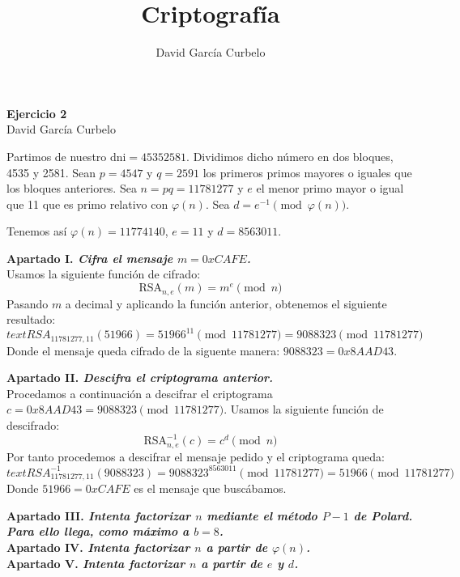 \documentclass[fleqn]{article}
\author{David García Curbelo}
\title{Criptografía}
\begin{document}
    \begin{center}
        \LARGE{\textbf{Ejercicio 2}} \\
        \Large{David García Curbelo} \\
    \end{center}

    \vspace{1cm}

    Partimos de nuestro dni$= 45352581$. Dividimos dicho número en dos bloques, 4535 y 2581. Sean $p = 4547$ y $q = 2591$ los 
    primeros primos mayores o iguales que los bloques anteriores. Sea $n = pq = 11781277$ y $e$ el menor primo mayor o igual que
    11 que es primo relativo con $\varphi(n)$. Sea $d = e^{-1} \pmod{\varphi(n)}$.

    Tenemos así $\varphi(n) = 11774140$, $e = 11$ y $d = 8563011$.

    \vspace{1cm}

    \textbf{Apartado I. \textit{Cifra el mensaje $m = 0xCAFE$.}}\\
    Usamos la siguiente función de cifrado:
    $$\text{RSA}_{n,e} (m) = m^e \pmod{n}$$
    Pasando $m$ a decimal y aplicando la función anterior, obtenemos el siguiente resultado:
    $$text{RSA}_{11781277, 11} (51966) = 51966^{11} \pmod{11781277} = 9088323 \pmod{11781277}$$
    Donde el mensaje queda cifrado de la siguente manera: $9088323 = 0x8AAD43$.


    \newpage
    \textbf{Apartado II. \textit{Descifra el criptograma anterior.}}\\
    Procedamos a continuación a descifrar el criptograma $c = 0x8AAD43 = 9088323 \pmod{11781277}$. Usamos la siguiente función de 
    descifrado:
    $$\text{RSA}_{n,e}^{-1} (c) = c^d \pmod{n}$$
    Por tanto procedemos a descifrar el mensaje pedido y el criptograma queda:
    $$text{RSA}_{11781277, 11}^{-1} (9088323) = 9088323^{8563011} \pmod{11781277} = 51966 \pmod{11781277}$$
    Donde $51966 = 0xCAFE$ es el mensaje que buscábamos.


    \newpage
    \textbf{Apartado III. \textit{Intenta factorizar $n$ mediante el método $P-1$ de Polard. Para ello llega, como máximo a $b=8$.}}\\

    \newpage
    \textbf{Apartado IV. \textit{Intenta factorizar $n$ a partir de $\varphi(n)$.}}\\

    \newpage
    \textbf{Apartado V. \textit{Intenta factorizar $n$ a partir de $e$ y $d$.}}\\ 
\end{document}
